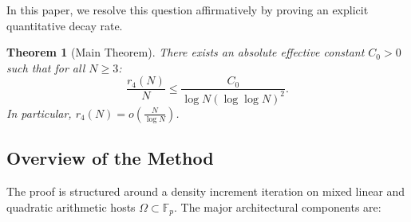 \documentclass[11pt,reqno]{amsart}
\theoremstyle{plain}
\newtheorem{theorem}{Theorem}[section]
\theoremstyle{definition}
\newcommand{\F}{\mathbb{F}}
\begin{document}
In this paper, we resolve this question affirmatively by proving an explicit quantitative decay rate.

\begin{theorem}[Main Theorem]\label{thm:main}
There exists an absolute effective constant $C_0 > 0$ such that for all $N \ge 3$:
\begin{equation}
\frac{r_4(N)}{N} \le \frac{C_0}{\log N (\log\log N)^2}.
\end{equation}
In particular, $r_4(N) = o\left( \frac{N}{\log N} \right)$.
\end{theorem}

\subsection{Overview of the Method}

The proof is structured around a density increment iteration on mixed linear and quadratic arithmetic hosts $\Omega \subset \F_p$.
The major architectural components are:
\end{document}

